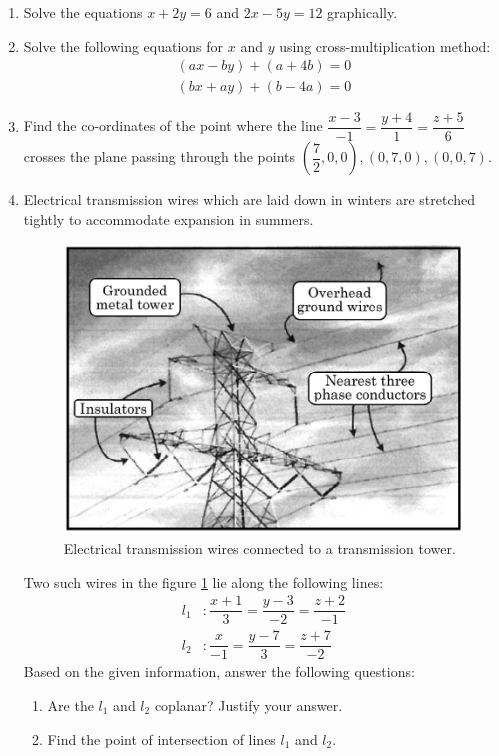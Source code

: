 %
\begin{enumerate}

	\item Solve the equations $x+2y=6$ and $2x-5y=12$ graphically.	

	\item Solve the following equations for $x$ and $y$ using cross-multiplication method:
		\begin{align}
			(ax-by)+(a+4b)=0\\(bx+ay)+(b-4a)=0
		\end{align}

	\item Find the co-ordinates of the point where the line $\dfrac{x-3}{-1}=\dfrac{y+4}{1}=\dfrac{z+5}{6}$ crosses the plane passing through the points $\left(\dfrac{7}{2},0,0\right),(0,7,0),(0,0,7)$.

	\item Electrical transmission wires which are laid down in winters are stretched tightly to accommodate expansion in summers.
		\begin{figure}[H]
			\centering
			\includegraphics[width=\columnwidth]{figs/txn}
			\caption{Electrical transmission wires connected to a transmission tower.}
			\label{fig:txn1}
		\end{figure}
		Two such wires in the figure \ref{fig:txn1} lie along the following lines:
		\begin{align}
			l_1 &: \dfrac{x+1}{3}=\dfrac{y-3}{-2}=\dfrac{z+2}{-1}\\
			l_2 &: \dfrac{x}{-1}=\dfrac{y-7}{3}=\dfrac{z+7}{-2}
		\end{align}
		Based on the given information, answer the following questions:
		\begin{enumerate}
			\item	Are the $l_1$ and $l_2$ coplanar? Justify your answer.
			\item    Find the point of intersection of lines $l_1$ and $l_2$.
		\end{enumerate}


\end{enumerate}
